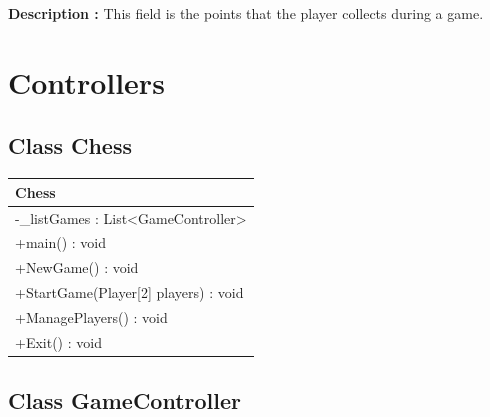 \documentclass[12pt]{article}
\begin{document}
\textbf{Description :} This field is the points that the player collects during a game.

\newpage


\section{Controllers}


\subsection{Class Chess}

\begin{table}[H]
    \begin{tabular}{|l|}
    \hline
    \rowcolor[HTML]{C0C0C0} 
    \textbf{Chess}                                             \\ \hline
    \rowcolor[HTML]{EFEFEF} 
    -\_listGames : List\textless{}GameController\textgreater{} \\ \hline
    +main() : void                                             \\ \hline
    +NewGame() : void                                          \\ \hline
    +StartGame(Player{[}2{]} players) : void                   \\ \hline
    +ManagePlayers() : void                                    \\ \hline
    +Exit() : void                                             \\ \hline
    \end{tabular}
\end{table}

\newpage


\subsection{Class GameController}
\end{document}
